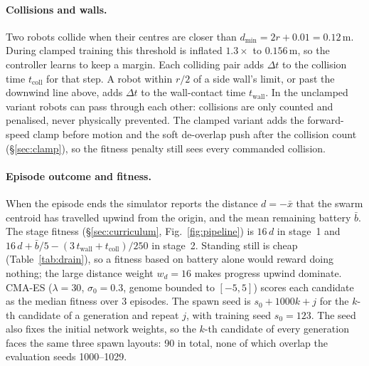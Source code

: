 \documentclass[11pt]{article}
\begin{document}
\paragraph{Collisions and walls.} Two robots collide when their centres are closer than
$d_{\min} = 2r + 0.01 = 0.12$\,m. During clamped training this threshold is inflated
$1.3\times$ to $0.156$\,m, so the controller learns to keep a margin. Each colliding pair adds
$\Delta t$ to the collision time $t_{\text{coll}}$ for that step. A robot within $r/2$ of a
side wall's limit, or past the downwind line above, adds $\Delta t$ to the wall-contact time
$t_{\text{wall}}$. In the unclamped variant robots can pass through each other: collisions
are only counted and penalised, never physically prevented. The clamped variant adds the
forward-speed clamp before motion and the soft de-overlap push after the collision count
(\S\ref{sec:clamp}), so the fitness penalty still sees every commanded collision.

\paragraph{Episode outcome and fitness.} When the episode ends the simulator reports the
distance $d = -\bar x$ that the swarm centroid has travelled upwind from the origin, and the
mean remaining battery $\bar b$. The stage fitness (\S\ref{sec:curriculum},
Fig.~\ref{fig:pipeline}) is $16\,d$ in stage~1 and
$16\,d + \bar b/5 - (3\,t_{\text{wall}} + t_{\text{coll}})/250$ in stage~2. Standing still is
cheap (Table~\ref{tab:drain}), so a fitness based on battery alone would reward doing
nothing; the large distance weight $w_d = 16$ makes progress upwind dominate. CMA-ES
($\lambda = 30$, $\sigma_0 = 0.3$, genome bounded to $[-5, 5]$) scores each candidate as the
median fitness over 3 episodes. The spawn seed is $s_0 + 1000k + j$ for the $k$-th candidate
of a generation and repeat $j$, with training seed $s_0 = 123$. The seed also fixes the
initial network weights, so the $k$-th candidate of every generation faces the same three
spawn layouts: 90 in total, none of which overlap the evaluation seeds 1000--1029.
\end{document}
